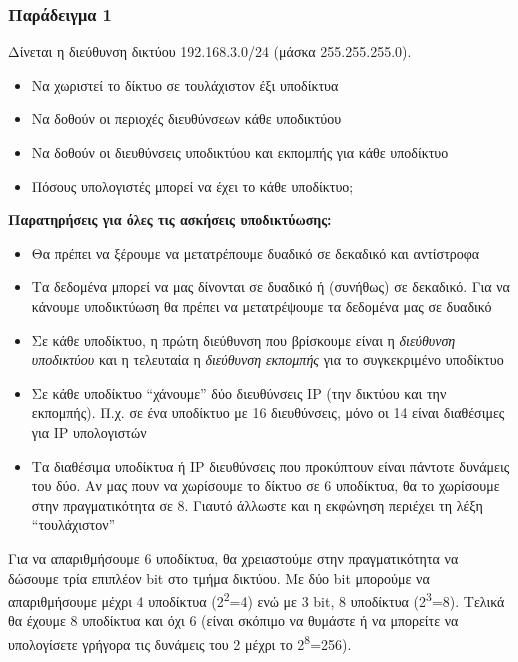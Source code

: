 \subsubsection*{Παράδειγμα 1}
Δίνεται η διεύθυνση δικτύου 192.168.3.0/24 (μάσκα 255.255.255.0).

\begin{itemize}
\item Να χωριστεί το δίκτυο σε τουλάχιστον έξι υποδίκτυα
\item Να δοθούν οι περιοχές διευθύνσεων κάθε υποδικτύου
\item Να δοθούν οι διευθύνσεις υποδικτύου και εκπομπής για κάθε υποδίκτυο
\item Πόσους υπολογιστές μπορεί να έχει το κάθε υποδίκτυο;
\end{itemize}

\begin{inthebox}
\textbf{Παρατηρήσεις για όλες τις ασκήσεις υποδικτύωσης:}

\begin{itemize}
\item Θα πρέπει να ξέρουμε να μετατρέπουμε δυαδικό σε δεκαδικό και αντίστροφα
\item Τα δεδομένα μπορεί να μας δίνονται σε δυαδικό ή (συνήθως) σε δεκαδικό. Για να κάνουμε υποδικτύωση θα πρέπει να μετατρέψουμε τα δεδομένα μας σε δυαδικό
\item Σε κάθε υποδίκτυο, η πρώτη διεύθυνση που βρίσκουμε είναι η \emph{διεύθυνση υποδικτύου} και η τελευταία η \emph{διεύθυνση εκπομπής} για το συγκεκριμένο υποδίκτυο
\item Σε κάθε υποδίκτυο ``χάνουμε'' δύο διευθύνσεις IP (την δικτύου και την εκπομπής). Π.χ. σε ένα υποδίκτυο με 16 διευθύνσεις, μόνο οι 14 είναι διαθέσιμες για IP υπολογιστών
\item Τα διαθέσιμα υποδίκτυα ή IP διευθύνσεις που προκύπτουν είναι πάντοτε δυνάμεις του δύο. Αν μας πουν να χωρίσουμε το δίκτυο σε 6 υποδίκτυα, θα το χωρίσουμε στην πραγματικότητα σε 8. Γιαυτό άλλωστε και η εκφώνηση περιέχει τη λέξη ``τουλάχιστον''
\end{itemize}
\end{inthebox}

Για να απαριθμήσουμε 6 υποδίκτυα, θα χρειαστούμε στην πραγματικότητα να δώσουμε τρία επιπλέον bit στο τμήμα δικτύου. Με δύο bit μπορούμε να απαριθμήσουμε μέχρι 4 υποδίκτυα (2\textsuperscript{2}=4) ενώ με 3 bit, 8 υποδίκτυα (2\textsuperscript{3}=8). Τελικά θα έχουμε 8 υποδίκτυα και όχι 6 (είναι σκόπιμο να θυμάστε ή να μπορείτε να υπολογίσετε γρήγορα τις δυνάμεις του 2 μέχρι το 2\textsuperscript{8}=256).


